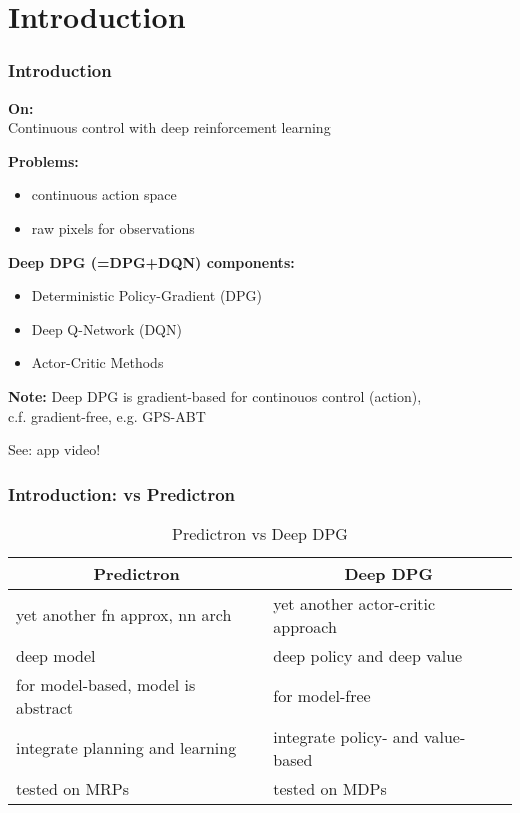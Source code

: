 \section{Introduction}

\begin{frame}
\frametitle{Introduction}
\textbf{On:}\\
Continuous control with deep reinforcement learning~\cite{Lillicrap2015}
\vspace{2mm}

\textbf{Problems:}
\begin{itemize}
  \item continuous action space
  \item raw pixels for observations
\end{itemize}
\vspace{2mm}

\textbf{Deep DPG (=DPG+DQN) components:}
\begin{itemize}
  \item Deterministic Policy-Gradient (DPG) \cite{Silver2014}
  \item Deep Q-Network (DQN) \cite{Mnih2013}
  \item Actor-Critic Methods \cite{Sutton1998}
\end{itemize}
\vspace{2mm}

\textbf{Note:}
Deep DPG is gradient-based for continouos control (action), \\
c.f. gradient-free, e.g. GPS-ABT~\cite{Seiler2015}
\vspace{2mm}

See: app video!
\end{frame}

\begin{frame}
\frametitle{Introduction: vs Predictron \cite{Silver2016}}

\begin{table}[]
\centering
\caption{Predictron vs Deep DPG}
\label{my-label}
\begin{tabular}{|l|l|}
\hline
\multicolumn{1}{|c|}{\textbf{Predictron}} & \multicolumn{1}{c|}{\textbf{Deep DPG}} \\ \hline
yet another fn approx, nn arch          & yet another actor-critic approach \\ \hline
deep model          & deep policy and deep value                \\ \hline
for model-based, model is abstract & for model-free                \\ \hline
integrate planning and learning & integrate policy- and value-based \\ \hline
tested on MRPs                  & tested on MDPs                \\ \hline
\end{tabular}
\end{table}
\end{frame}

